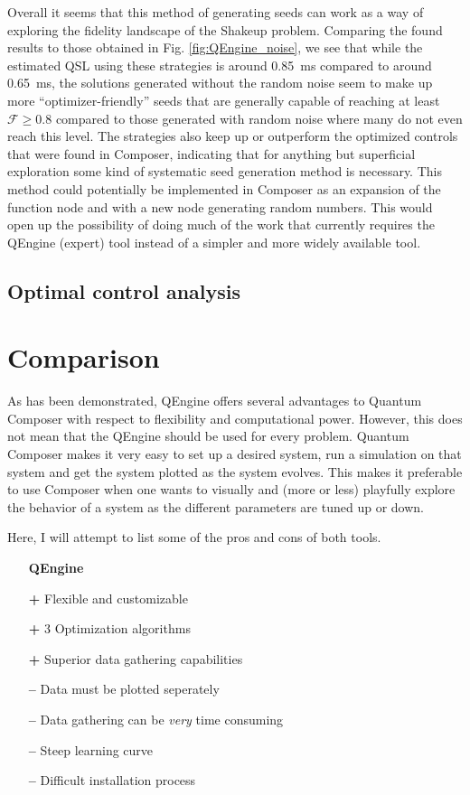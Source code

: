 \documentclass[a4paper, twocolumn]{revtex4-1}
\begin{document}
Overall it seems that this method of generating seeds can work as a way of exploring the fidelity landscape of the Shakeup problem. Comparing the found results to those obtained in Fig. \ref{fig:QEngine_noise}, we see that while the estimated QSL using these strategies is around \SI{0.85}{\ms} compared to around \SI{0.65}{\ms}, the solutions generated without the random noise seem to make up more ``optimizer-friendly'' seeds that are generally capable of reaching at least $\mathcal{F}\geq 0.8$ compared to those generated with random noise where many do not even reach this level. The strategies also keep up or outperform the optimized controls that were found in Composer, indicating that for anything but superficial exploration some kind of systematic seed generation method is necessary. This method could potentially be implemented in Composer as an expansion of the function node and with a new node generating random numbers. This would open up the possibility of doing much of the work that currently requires the QEngine (expert) tool instead of a simpler and more widely available tool.

\subsection{Optimal control analysis}

\section{Comparison}\label{sec:comparison}
As has been demonstrated, QEngine offers several advantages to Quantum Composer with respect to flexibility and computational power. However, this does not mean that the QEngine should be used for every problem. Quantum Composer makes it very easy to set up a desired system, run a simulation on that system and get the system plotted as the system evolves. This makes it preferable to use Composer when one wants to visually and (more or less) playfully explore the behavior of a system as the different parameters are tuned up or down.

Here, I will attempt to list some of the pros and cons of both tools.
\begin{itemize}
	\item[] \textbf{QEngine} 
	\item[\bf+] Flexible and customizable
	\item[\bf+] 3 Optimization algorithms
	\item[\bf+] Superior data gathering capabilities
	\item[\bf{--}] Data must be plotted seperately
	\item[\bf{--}] Data gathering can be \textit{very} time consuming
	\item[\bf{--}] Steep learning curve
	\item[\bf{--}] Difficult installation process
\end{itemize}
\end{document}
